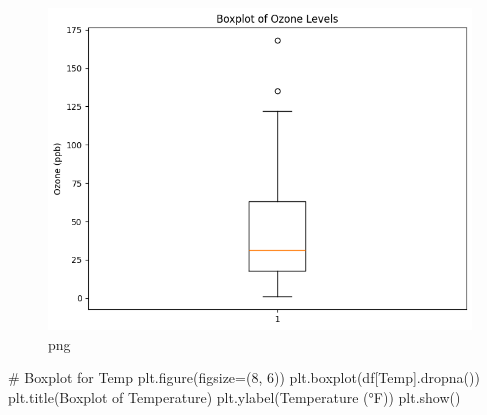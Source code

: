 \documentclass[
  letterpaper,
  DIV=11,
  numbers=noendperiod]{scrreprt}
\newenvironment{Shaded}{\begin{snugshade}}{\end{snugshade}}
\newcommand{\CommentTok}[1]{\textcolor[rgb]{0.37,0.37,0.37}{#1}}
\newcommand{\DecValTok}[1]{\textcolor[rgb]{0.68,0.00,0.00}{#1}}
\newcommand{\NormalTok}[1]{\textcolor[rgb]{0.00,0.23,0.31}{#1}}
\newcommand{\OperatorTok}[1]{\textcolor[rgb]{0.37,0.37,0.37}{#1}}
\newcommand{\StringTok}[1]{\textcolor[rgb]{0.13,0.47,0.30}{#1}}
\begin{document}
\begin{figure}[H]

{\centering \includegraphics{week4_baruga_python_files/week4_baruga_python_8_0.png}

}

\caption{png}

\end{figure}%

\begin{Shaded}
\begin{Highlighting}[]
\CommentTok{\# Boxplot for Temp}
\NormalTok{plt.figure(figsize}\OperatorTok{=}\NormalTok{(}\DecValTok{8}\NormalTok{, }\DecValTok{6}\NormalTok{))}
\NormalTok{plt.boxplot(df[}\StringTok{\textquotesingle{}Temp\textquotesingle{}}\NormalTok{].dropna())}
\NormalTok{plt.title(}\StringTok{\textquotesingle{}Boxplot of Temperature\textquotesingle{}}\NormalTok{)}
\NormalTok{plt.ylabel(}\StringTok{\textquotesingle{}Temperature (°F)\textquotesingle{}}\NormalTok{)}
\NormalTok{plt.show()}
\end{Highlighting}
\end{Shaded}
\end{document}
